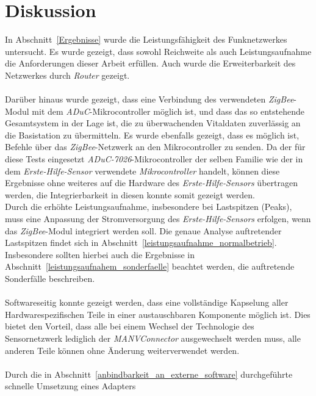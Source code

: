 
\chapter{Diskussion} 
In Abschnitt~\ref{Ergebnisse} wurde die Leistungsfähigkeit des Funknetzwerkes untersucht.
Es wurde gezeigt, dass sowohl Reichweite als auch Leistungsaufnahme die Anforderungen
dieser Arbeit erfüllen. Auch wurde die Erweiterbarkeit des Netzwerkes durch \emph{Router} gezeigt.\\
\\
Darüber hinaus wurde gezeigt, dass eine Verbindung des verwendeten \emph{ZigBee}-Modul
mit dem \emph{ADuC}-Mikrocontroller möglich ist, und dass das so entstehende Gesamtsystem
in der Lage ist, die zu überwachenden Vitaldaten zuverlässig an die Basistation zu übermitteln.
Es wurde ebenfalls gezeigt, dass es möglich ist, Befehle über das \emph{ZigBee}-Netzwerk
an den Mikrocontroller zu senden. Da der für diese Tests eingesetzt \emph{ADuC-7026}-Mikrocontroller
der selben Familie wie der in dem \emph{Erste-Hilfe-Sensor} verwendete \emph{Mikrocontroller} handelt,
können diese Ergebnisse ohne weiteres auf die Hardware des \emph{Erste-Hilfe-Sensors} übertragen werden, 
die Integrierbarkeit in diesen konnte somit gezeigt werden.\\
Durch die erhöhte Leistungsaufnahme, insbesondere bei Lastspitzen (Peaks), muss eine Anpassung
der Stromversorgung des \emph{Erste-Hilfe-Sensors} erfolgen, wenn das \emph{ZigBee}-Modul integriert
werden soll. Die genaue Analyse auftretender Lastspitzen findet sich in Abschnitt~\ref{leistungsaufnahme_normalbetrieb}.
Insbesondere sollten hierbei auch die Ergebnisse in Abschnitt~\ref{leistungsaufnahem_sonderfaelle} beachtet 
werden, die auftretende Sonderfälle beschreiben.\\
\\
Softwareseitig konnte gezeigt werden, dass eine vollständige Kapselung aller Hardwarespezifischen Teile
in einer austauschbaren Komponente möglich ist. Dies bietet den Vorteil, dass alle bei einem Wechsel 
der Technologie des Sensornetzwerk lediglich der \emph{MANVConnector} ausgewechselt werden muss,
alle anderen Teile können ohne Änderung weiterverwendet werden.\\
\\
Durch die in Abschnitt~\ref{anbindbarkeit_an_externe_software} durchgeführte schnelle Umsetzung eines Adapters 
